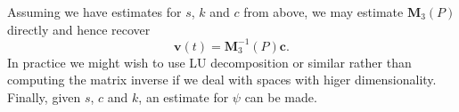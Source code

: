 Assuming we have estimates for $s$, $k$ and $c$ from above, we may
estimate $\mathbf{M}_3(P)$ directly and hence recover
\[
\mathbf{v}(t) = \mathbf{M}^{-1}_3(P) \mathbf{c}.
\]
In practice we might wish to use LU decomposition or similar rather
than computing the matrix inverse if we deal with spaces with higer
dimensionality. Finally, given $s$, $c$ and $k$, an estimate for 
$\psi$ can be made. 

